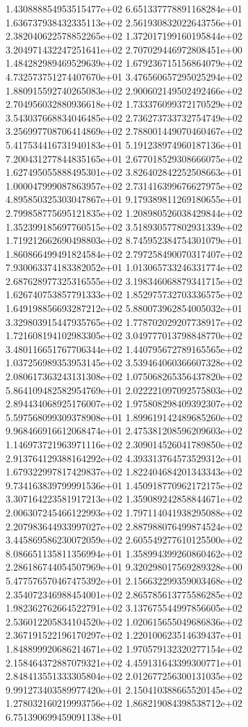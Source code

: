 1.430888854953515477e+02 6.651337778891168284e+01 1.636737938432335113e+02
2.561930832022643756e+01 2.382040622578852265e+02 1.372017199160195844e+02
3.204971432247251641e+02 2.707029446972808451e+00 1.484282989469529639e+02
1.679236715156864079e+02 4.732573751274407670e+01 3.476560657295025294e+02
1.880915592740265083e+02 2.900602149502492466e+02 2.704956032880936618e+02
1.733376099372170529e+02 3.543037668834046485e+02 2.736273733732754749e+02
3.256997708706414869e+02 2.788001449070460467e+02 5.417534416731940183e+01
5.191238974960187136e+01 7.200431277844835165e+01 2.677018529308666075e+02
1.627495055888495301e+02 3.826402842252508663e+01 1.000047999087863957e+02
2.731416399676627975e+02 4.895850325303047867e+01 9.179389811269180655e+01
2.799858775695121835e+02 1.208980526038429844e+02 1.352399185697760515e+02
3.518930577802931339e+02 1.719212662690498803e+02 8.745952384754301079e+01
1.860866499491824584e+02 2.797258490070317407e+02 7.930063374183382052e+01
1.013065733246331774e+02 2.687628977325316555e+02 3.198346068879341715e+02
1.626740753857791333e+02 1.852975732703336575e+02 1.649198856693287212e+02
5.880073962854005032e+01 3.329803915447935765e+02 1.778702029207738917e+02
1.721608194102983305e+02 3.049777013798848770e+02 3.480116651767706344e+02
1.440795672789165565e+02 1.037256989353953145e+02 3.539464060366607328e+02
2.080617363243131308e+02 1.075068265356437820e+02 5.864109482582954769e+01
2.022221097092575803e+02 2.894434068925176007e+02 1.975808298409392307e+02
5.597568099309378908e+01 1.899619142489685260e+02 9.968466916612068474e+01
2.475381208596209603e+02 1.146973721963971116e+02 2.309014526041789850e+02
2.913764129388164292e+02 4.393313764573529312e+01 1.679322997817429837e+02
1.822404684201343343e+02 9.734163839799991536e+01 1.450918770962172175e+02
3.307164223581917213e+02 1.359089242858844671e+02 2.006307245466122993e+02
1.797114041938295088e+02 2.207983644933997027e+02 2.887988076499874524e+02
3.445869586230072059e+02 2.605549277610125500e+02 8.086651135811356994e+01
1.358994399260860462e+02 2.286186744054507969e+01 9.320298017569289328e+00
5.477576570467475392e+01 2.156632299359003468e+02 2.354072346988454001e+02
2.865785613775586285e+02 1.982362762664522791e+02 3.137675544997856605e+02
2.536012205834104520e+02 1.020615655049686836e+02 2.367191522196170297e+02
1.220100623514639437e+01 1.848899920686214671e+02 1.970579132320277154e+02
2.158464372887079321e+02 4.459131643399300771e+01 2.848413551333305804e+02
2.012677256300131035e+02 9.991273403589977420e+01 2.150410388665520145e+02
1.278032160219993756e+02 1.868219084398538712e+02 6.751390699459091138e+01
